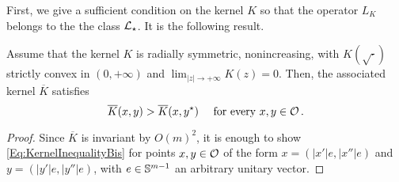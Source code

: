 First, we give a sufficient condition on the kernel $K$ so that the operator $L_K$ belongs to the the class $\mathcal{L}_\star$. It is the following result.

\begin{proposition}
\label{Prop:KernelInequalitySufficientCondition} Assume that the kernel $K$ is radially symmetric, nonincreasing, with $K(\sqrt{\cdot})$ strictly convex in $(0,+\infty)$ and $\lim_{|z|\to+\infty} K(z) = 0$. Then, the associated kernel $\overline{K}$ satisfies
	\begin{equation}
	\label{Eq:KernelInequalityBis}
	\overline{K}(x,y) > \overline{K}(x, y^\star) \quad \text{ for every }x,y \in \mathcal{O}\,.
	\end{equation}
\end{proposition}

\begin{proof}
Since $\overline{K}$ is invariant by $O(m)^2$, it is enough to show \eqref{Eq:KernelInequalityBis} for points $x, y\in \mathcal{O}$ of the form $x = (|x'|e, |x''|e)$ and $y = (|y'|e, |y''|e)$, with $e \in \mathbb{S}^{m-1}$ an arbitrary unitary vector.



\end{proof}
